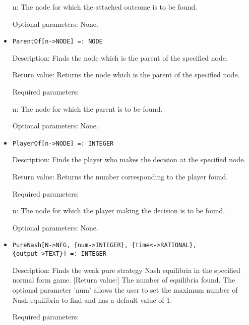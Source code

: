 \begin{itemize}
\bd
\item
[n:] The node for which the attached outcome is to be found.
\ed

\item
[Optional parameters:] None.
\ed

\item

\protect \large \begin{verbatim}
ParentOf[n->NODE] =: NODE
\end{verbatim}\normalsize

\bd
\item
[Description:] Finds the node which is the parent of the specified
node.
\item
[Return value:] Returns the node which is the parent of the specified
node.
\item
[Required parameters:]\hfil\null
	
\bd
\item
[n:] The node for which the parent is to be found.
\ed

\item
[Optional parameters:] None.
\ed

\item
\protect \large \begin{verbatim}
PlayerOf[n->NODE] =: INTEGER
\end{verbatim}\normalsize

\bd
\item
[Description:] Finds the player who makes the decision at the
specified node.
\item
[Return value:] Returns the number corresponding to the player found.
\item
[Required parameters:]\hfil\null

\bd
\item
[n:] The node for which the player making the decision is to be found.
\ed

\item
[Optional parameters:] None.
\ed

\item
\protect \large \begin{verbatim}
PureNash[N->NFG, {num->INTEGER}, {time<->RATIONAL},
{output->TEXT}] =: INTEGER
\end{verbatim}\normalsize

\bd
\item
[Description:] Finds the weak pure strategy Nash equilibria in the
specified normal form game.  [Return value:] The number of equilibria
found.  The optional parameter 'num' allows the user to set the
maximum number of Nash equilibria to find and has a default value of
1.
\item
[Required parameters:]\hfil\null
	

\end{itemize}
